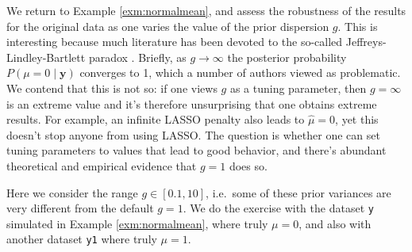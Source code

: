 \documentclass[
]{book}
\newcommand{\by}{\mathbf{y}}
\theoremstyle{definition}
\theoremstyle{definition}
\theoremstyle{definition}
\theoremstyle{definition}
\theoremstyle{remark}
\begin{document}
We return to Example \ref{exm:normalmean},
and assess the robustness of the results for the original data as one varies the value of the prior dispersion \(g\).
This is interesting because much literature has been devoted to the so-called Jeffreys-Lindley-Bartlett paradox \citep{lindley:1957}. Briefly, as \(g \to \infty\) the posterior probability \(P(\mu=0 \mid \by)\) converges to 1, which a number of authors viewed as problematic.
We contend that this is not so: if one views \(g\) as a tuning parameter, then \(g= \infty\) is an extreme value and it's therefore unsurprising that one obtains extreme results. For example, an infinite LASSO penalty also leads to \(\hat{\mu}=0\), yet this doesn't stop anyone from using LASSO. The question is whether one can set tuning parameters to values that lead to good behavior, and there's abundant theoretical and empirical evidence that \(g=1\) does so.

Here we consider the range \(g \in [0.1, 10]\), i.e.~some of these prior variances are very different from the default \(g=1\).
We do the exercise with the dataset \texttt{y} simulated in Example \ref{exm:normalmean}, where truly \(\mu=0\), and also with another dataset \texttt{y1} where truly \(\mu=1\).
\end{document}
